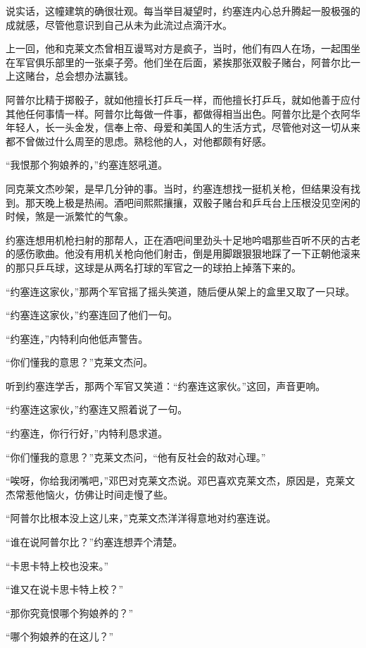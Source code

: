    说实话，这幢建筑的确很壮观。每当举目凝望时，约塞连内心总升腾起一股极强的成就感，尽管他意识到自己从未为此流过点滴汗水。

 


    上一回，他和克莱文杰曾相互谩骂对方是疯子，当时，他们有四人在场，一起围坐在军官俱乐部里的一张桌子旁。他们坐在后面，紧挨那张双骰子赌台，阿普尔比一上这赌台，总会想办法赢钱。

    阿普尔比精于掷骰子，就如他擅长打乒乓一样，而他擅长打乒乓，就如他善于应付其他任何事情一样。阿普尔比每做一件事，都做得相当出色。阿普尔比是个衣阿华年轻人，长一头金发，信奉上帝、母爱和美国人的生活方式，尽管他对这一切从来都不曾做过什么周至的思虑。熟稔他的人，对他都颇有好感。

    “我恨那个狗娘养的，”约塞连怒吼道。

    同克莱文杰吵架，是早几分钟的事。当时，约塞连想找一挺机关枪，但结果没有找到。那天晚上极是热闹。酒吧间熙熙攘攘，双骰子赌台和乒乓台上压根没见空闲的时候，煞是一派繁忙的气象。

    约塞连想用机枪扫射的那帮人，正在酒吧间里劲头十足地吟唱那些百听不厌的古老的感伤歌曲。他没有用机关枪向他们射击，倒是用脚跟狠狠地踩了一下正朝他滚来的那只乒乓球，这球是从两名打球的军官之一的球拍上掉落下来的。

    “约塞连这家伙，”那两个军官摇了摇头笑道，随后便从架上的盒里又取了一只球。

    “约塞连这家伙，”约塞连回了他们一句。

    “约塞连，”内特利向他低声警告。

    “你们懂我的意思？”克莱文杰问。

    听到约塞连学舌，那两个军官又笑道：“约塞连这家伙。”这回，声音更响。

    “约塞连这家伙，”约塞连又照着说了一句。

    “约塞连，你行行好，”内特利恳求道。

    “你们懂我的意思？”克莱文杰问，“他有反社会的敌对心理。”

    “唉呀，你给我闭嘴吧，”邓巴对克莱文杰说。邓巴喜欢克莱文杰，原因是，克莱文杰常惹他恼火，仿佛让时间走慢了些。

    “阿普尔比根本没上这儿来，”克莱文杰洋洋得意地对约塞连说。

    “谁在说阿普尔比？”约塞连想弄个清楚。

    “卡思卡特上校也没来。”

    “谁又在说卡思卡特上校？”

    “那你究竟恨哪个狗娘养的？”

    “哪个狗娘养的在这儿？”

